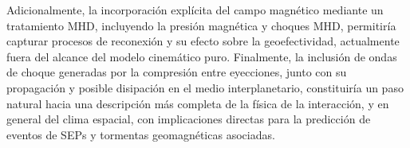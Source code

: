 Adicionalmente, la incorporación explícita del campo magnético mediante un tratamiento MHD, incluyendo la presión magnética y choques MHD, permitiría capturar procesos de reconexión y su efecto sobre la geoefectividad, actualmente fuera del alcance del modelo cinemático puro. Finalmente, la inclusión de ondas de choque generadas por la compresión entre eyecciones, junto con su propagación y posible disipación en el medio interplanetario, constituiría un paso natural hacia una descripción más completa de la física de la interacción, y en general del clima espacial, con implicaciones directas para la predicción de eventos de SEPs y tormentas geomagnéticas asociadas.